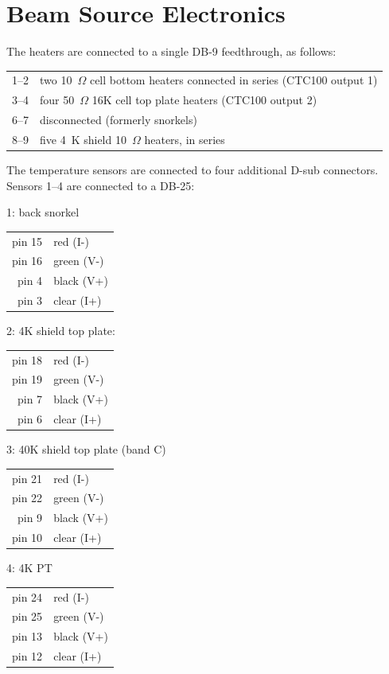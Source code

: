 \section{Beam Source Electronics}

The heaters are connected to a single DB-9 feedthrough, as follows:

\begin{tabular}{rl}
1--2 & two 10~$\Omega$ cell bottom heaters connected in series (CTC100 output
    1)\\
3--4 & four 50~$\Omega$ 16K cell top plate heaters (CTC100 output 2)\\
6--7 & disconnected (formerly snorkels)\\
8--9 & five 4~K shield 10~$\Omega$ heaters, in series
\end{tabular}

The temperature sensors are connected to four additional D-sub connectors.
Sensors 1--4 are connected to a DB-25:

1: back snorkel

\begin{tabular}{rl}
    pin 15 & red (I-)\\
    pin 16 & green (V-)\\
     pin 4 & black (V+)\\
     pin 3 & clear (I+)\\
\end{tabular}

2: 4K shield top plate:

\begin{tabular}{rl}
    pin 18 & red (I-)\\
    pin 19 & green (V-)\\
     pin 7 & black (V+)\\
     pin 6 & clear (I+)\\
\end{tabular}

3: 40K shield top plate (band C)

\begin{tabular}{rl}
    pin 21 & red (I-)\\
    pin 22 & green (V-)\\
     pin 9 & black (V+)\\
    pin 10 & clear (I+)\\
\end{tabular}

4: 4K PT

\begin{tabular}{rl}
    pin 24 & red (I-)\\
    pin 25 & green (V-)\\
    pin 13 & black (V+)\\
    pin 12 & clear (I+)\\
\end{tabular}

